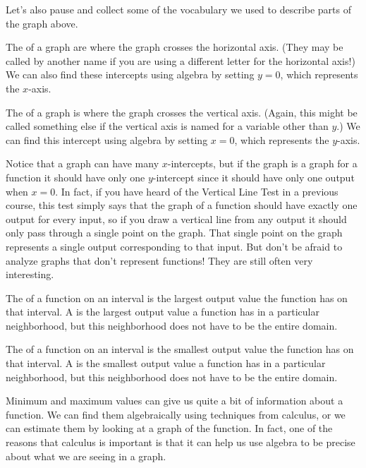 \documentclass{ximera}
\begin{document}
Let's also pause and collect some of the vocabulary we used to describe parts of the graph above. 
\begin{definition}
The  of a graph are where the graph crosses the horizontal axis. (They may be called by another name if you are using a different letter for the horizontal axis!) We can also find these intercepts using algebra by setting $y=0$, which represents the $x$-axis.

The  of a graph is where the graph crosses the vertical axis. (Again, this might be called something else if the vertical axis is named for a variable other than $y$.) We can find this intercept using algebra by setting $x=0$, which represents the $y$-axis.
\end{definition}
Notice that a graph can have many $x$-intercepts, but if the graph is a graph for a function it should have only one $y$-intercept since it should have only one output when $x=0$. In fact, if you have heard of the Vertical Line Test in a previous course, this test simply says that the graph of a function should have exactly one output for every input, so if you draw a vertical line from any output it should only pass through a single point on the graph. That single point on the graph represents a single output corresponding to that input. But don't be afraid to analyze graphs that don't represent functions! They are still often very interesting.

\begin{definition}
The  of a function on an interval is the largest output value the function has on that interval. A  is the largest output value a function has in a particular neighborhood, but this neighborhood does not have to be the entire domain.

The  of a function on an interval is the smallest output value the function has on that interval. A  is the smallest output value a function has in a particular neighborhood, but this neighborhood does not have to be the entire domain.
\end{definition}
Minimum and maximum values can give us quite a bit of information about a function. We can find them algebraically using techniques from calculus, or we can estimate them by looking at a graph of the function. In fact, one of the reasons that calculus is important is that it can help us use algebra to be precise about what we are seeing in a graph.
\end{document}
